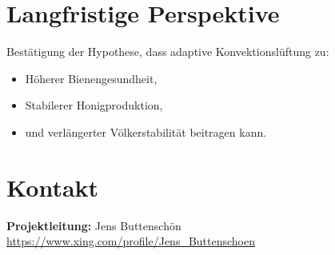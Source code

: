 \documentclass[11pt,a4paper]{article}
\begin{document}
\section*{Langfristige Perspektive}
Best\"atigung der Hypothese, dass adaptive Konvektionsl\"uftung zu:
\begin{itemize}[topsep=2pt]
  \item H\"oherer Bienengesundheit,
  \item Stabilerer Honigproduktion,
  \item und verl\"angerter V\"olkerstabilit\"at beitragen kann.
\end{itemize}

\section*{Kontakt}
\textbf{Projektleitung:} Jens Buttensch\"on \\
\small{\url{https://www.xing.com/profile/Jens_Buttenschoen}}
\end{document}
